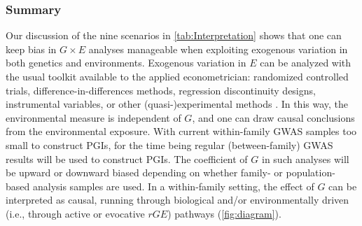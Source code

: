 \documentclass[12pt,a4paper]{article}
\begin{document}
\begin{bibunit}
\subsubsection{Summary}
Our discussion of the nine scenarios in \autoref{tab:Interpretation} shows that one can keep bias in $G \times E$ analyses manageable when exploiting exogenous variation in both genetics and environments. Exogenous variation in $E$ can be analyzed with the usual toolkit available to the applied econometrician: randomized controlled trials, difference-in-differences methods, regression discontinuity designs, instrumental variables, or other (quasi-)experimental methods \citep{Schmitz2017}. In this way, the environmental measure is independent of $G$, and one can draw causal conclusions from the environmental exposure. With current within-family GWAS samples too small to construct PGIs, for the time being regular (between-family) GWAS results will be used to construct PGIs. The coefficient of $G$ in such analyses will be upward or downward biased depending on whether family- or population-based analysis samples are used. In a within-family setting, the effect of $G$ can be interpreted as causal, running through biological and/or environmentally driven (i.e., through active or evocative $rGE$) pathways (\autoref{fig:diagram}). 



\end{bibunit}
\end{document}
